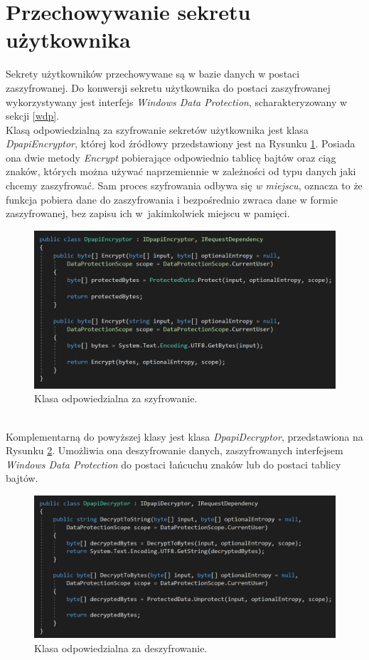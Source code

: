 \section{Przechowywanie sekretu użytkownika}
Sekrety użytkowników przechowywane są w bazie danych w postaci zaszyfrowanej. 
Do konwersji sekretu użytkownika do postaci zaszyfrowanej wykorzystywany 
jest interfejs \textit{Windows Data Protection}, scharakteryzowany w sekcji \ref{wdp}. \\
Klasą odpowiedzialną za szyfrowanie sekretów użytkownika jest klasa \textit{DpapiEncryptor}, której
kod źródłowy przedstawiony jest na Rysunku \ref{code-encrypt}. Posiada ona dwie metody \textit{Encrypt}
pobierające odpowiednio tablicę bajtów oraz ciąg znaków, których można używać naprzemiennie w zależności 
od typu danych jaki chcemy zaszyfrować. Sam proces szyfrowania odbywa się \textit{w miejscu}, oznacza to że 
funkcja pobiera dane do zaszyfrowania i bezpośrednio zwraca dane w formie zaszyfrowanej, bez zapisu ich 
w~jakimkolwiek miejscu w pamięci.
\begin{figure}[t]
    \centering
	\includegraphics[width=\textwidth]{content/images/code-encrypt}
    \caption{Klasa odpowiedzialna za szyfrowanie.}
    \label{code-encrypt}
\end{figure} \\
Komplementarną do powyższej klasy jest klasa \textit{DpapiDecryptor}, przedstawiona na Rysunku \ref{code-decrypt}. 
Umożliwia ona deszyfrowanie danych, zaszyfrowanych interfejsem \textit{Windows Data Protection} do 
postaci łańcuchu znaków lub do postaci tablicy bajtów.
\begin{figure}[t]
    \centering
	\includegraphics[width=\textwidth]{content/images/code-decrypt}
    \caption{Klasa odpowiedzialna za deszyfrowanie.}
    \label{code-decrypt}
\end{figure}

